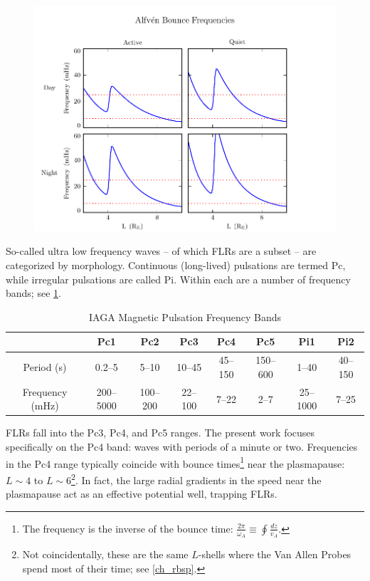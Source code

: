 \begin{figure}[!htb]
    \centering
    \includegraphics[width=\textwidth]{figures/fa.pdf}
    \caption[\Alfven Bounce Frequencies]{
    }
    \label{fig_fa}
\end{figure}

So-called ultra low frequency waves  -- of which FLRs are a subset -- are categorized by morphology. Continuous (long-lived) pulsations are termed Pc, while irregular pulsations are called Pi. Within each are a number of frequency bands; see \cref{tab_iaga}\cite{jacobs_1964}. 

\begin{longtable}{ @{\extracolsep{\fill}} cccccccc @{\extracolsep{\fill}} }
  \caption[IAGA Magnetic Pulsation Frequency Bands]{IAGA Magnetic Pulsation Frequency Bands}
  \label{tab_iaga} \\
  \toprule
  & Pc1 & Pc2 & Pc3 & Pc4 & Pc5 & Pi1 & Pi2 \\
  \midrule
  \endfirsthead
  \bottomrule
  \endlastfoot
  Period (\si{\second}) & 0.2--5    & 5--10    & 10--45  & 45--150 & 150--600 & 1--40    & 40--150 \\
  Frequency (\si{\mHz}) & 200--5000 & 100--200 & 22--100 & 7--22   & 2--7     & 25--1000 & 7--25 \\
\end{longtable}

FLRs fall into the Pc3, Pc4, and Pc5 ranges. The present work focuses specifically on the Pc4 band: waves with periods of a minute or two. Frequencies in the Pc4 range typically coincide with \Alfven bounce times\footnote{The \Alfven frequency is the inverse of the \Alfven bounce time: $\frac{2 \pi}{\omega_A} \equiv \oint \frac{dz}{v_A}$. } near the plasmapause: $L\sim4$ to $L\sim6$\cite{anderson_1990,dai_2015,engebretson_1992,liu_2009}\footnote{Not coincidentally, these are the same $L$-shells where the Van Allen Probes spend most of their time; see \cref{ch_rbsp}. }. In fact, the large radial gradients in the \Alfven speed near the plasmapause act as an effective potential well, trapping FLRs\cite{dai_2009,klimushkin_2004,lee_1999,leonovich_2000,mager_2013,takahashi_2010}. 

